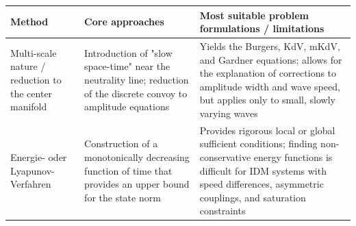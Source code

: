 \documentclass[11pt,a4paper,openany]{book}
\numberwithin{equation}{chapter}
\numberwithin{figure}{chapter}
\numberwithin{table}{chapter}
\begin{document}
\begin{center}
\small
{}
\label{tab:nonlinear-methods}
\begin{tabular}{p{3.0cm}p{5.0cm}p{5.7cm}}
\toprule
\textbf{Method} & \textbf{Core approaches} & \textbf{Most suitable problem formulations / limitations} \\
\midrule









Multi-scale nature / reduction to the center manifold






&






Introduction of "slow space-time" near the neutrality line; reduction of the discrete convoy to amplitude equations






&






Yields the Burgers, KdV, mKdV, and Gardner equations; allows for the explanation of corrections to amplitude width and wave speed, but applies only to small, slowly varying waves






\\[4pt]

Energie- oder Lyapunov-Verfahren




&






Construction of a monotonically decreasing function of time that provides an upper bound for the state norm






&






Provides rigorous local or global sufficient conditions; finding non-conservative energy functions is difficult for IDM systems with speed differences, asymmetric couplings, and saturation constraints







\end{tabular}
\end{center}
\end{document}
